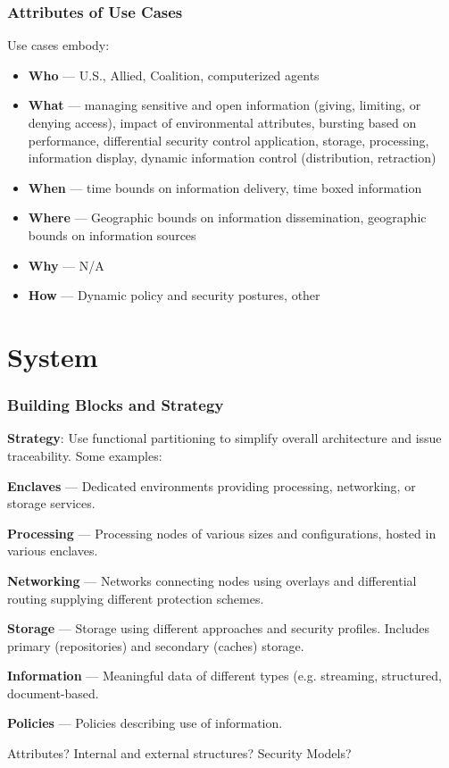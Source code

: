 \documentclass[t,handout]{beamer}
\begin{document}
\begin{frame}
\frametitle{Attributes of Use Cases}
Use cases embody:
\begin{itemize}
\item {\bf Who} --- U.S., Allied, Coalition, computerized agents
\item {\bf What} --- managing sensitive and open information (giving, limiting, or denying access), impact of environmental attributes, bursting based on performance, differential security control application, storage, processing, information display, dynamic information control (distribution, retraction)
\item {\bf When} --- time bounds on information delivery, time boxed information
\item {\bf Where} --- Geographic bounds on information dissemination, geographic bounds on information sources
\item {\bf Why} --- N/A
\item {\bf How} --- Dynamic policy and security postures, other
\end{itemize}
\end{frame}

\section{System}

\begin{frame}
\frametitle{Building Blocks and Strategy}
{\bf Strategy}: Use functional partitioning to simplify overall architecture and issue traceability. Some examples:
\begin{itemize}
{\small 
\item {\bf Enclaves} --- Dedicated environments providing processing, networking, or storage services.
\item {\bf Processing} --- Processing nodes of various sizes and configurations, hosted in various enclaves.
\item {\bf Networking} --- Networks connecting nodes using overlays and differential routing supplying different protection schemes.
\item {\bf Storage} --- Storage using different approaches and security profiles.  Includes primary (repositories) and secondary (caches) storage.
\item {\bf Information} --- Meaningful data of different types (e.g. streaming, structured, document-based.
\item {\bf Policies} --- Policies describing use of information.
}
\end{itemize}
Attributes? Internal and external structures? Security Models?
\end{frame}
\end{document}
